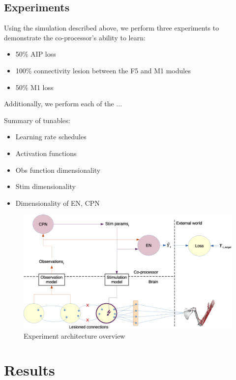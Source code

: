 \documentclass[12pt]{iopart}
\begin{document}
\subsection{Experiments}
\label{sec:experiments}

Using the simulation described above, we perform three experiments to
demonstrate the co-processor's ability to learn:
\begin{itemize}
	\item 50\% AIP loss
	\item 100\% connectivity lesion between the F5 and M1 modules
	\item 50\% M1 loss
\end{itemize}

Additionally, we perform each of the ...

Summary of tunables:
\begin{itemize}
	\item Learning rate schedules
	\item Activation functions
	\item Obs function dimensionality
	\item Stim dimensionality
	\item Dimensionality of EN, CPN
\end{itemize}

\begin{figure}
\includegraphics[width=\textwidth]{cpn_michaels_arch_labeled.eps}
\caption{Experiment architecture overview}
\centering
\label{fig:exp_overview}
\end{figure}

\section{Results}
\end{document}
